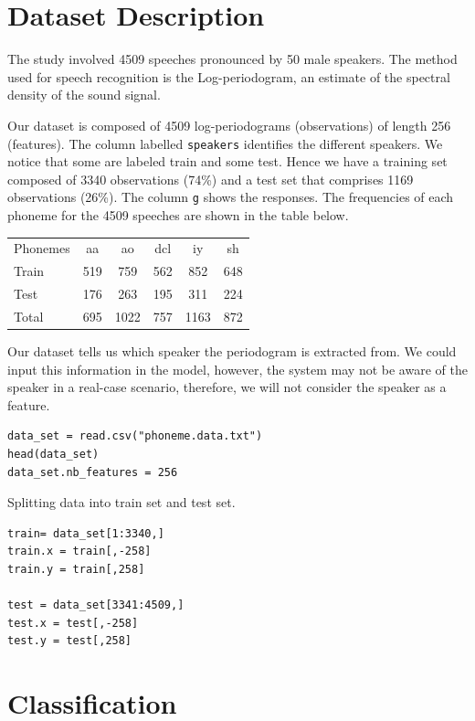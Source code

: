 \documentclass[]{report}
\begin{document}
\section{Dataset Description}

The study involved 4509 speeches pronounced by 50 male speakers. The method used for speech recognition is the Log-periodogram, an estimate of the spectral density of the sound signal.

Our dataset is composed of 4509 log-periodograms (observations) of length 256 (features). The column labelled \texttt{speakers} identifies the different speakers. We notice that some are labeled train and some test. Hence we have a training set composed of 3340 observations (74\%) and a test set that comprises 1169 observations (26\%). The column \texttt{g} shows the responses. The frequencies of each phoneme for the 4509 speeches are shown in the table below.

\begin{center}
\begin{tabular}{l c c c c c}
 Phonemes	 & aa &  ao & dcl & iy & sh \\
Train & 519 & 759 & 562 & 852 & 648\\
Test  & 176 & 263 & 195 & 311 & 224\\
Total & 695 & 1022 & 757 & 1163 & 872
\end{tabular}
\end{center}

Our dataset tells us which speaker the periodogram is extracted from. We could input this information in the model, however, the system may not be aware of the speaker in a real-case scenario, therefore, we will not consider the speaker as a feature. 

\begin{lstlisting}
data_set = read.csv("phoneme.data.txt")
head(data_set)
data_set.nb_features = 256
\end{lstlisting}

Splitting data into train set and test set.
\begin{lstlisting}
train= data_set[1:3340,]
train.x = train[,-258]
train.y = train[,258]

test = data_set[3341:4509,]
test.x = test[,-258]
test.y = test[,258]
\end{lstlisting}

\section{Classification}
\end{document}
